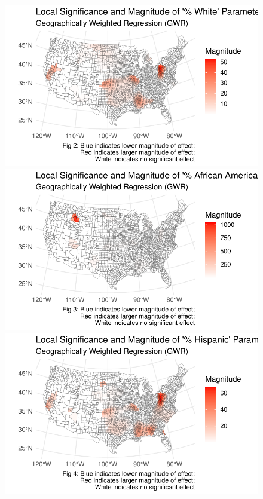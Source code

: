 \documentclass[
]{article}
\begin{document}
\begin{figure}

\begin{minipage}{0.50\linewidth}
\includegraphics{report_files/figure-pdf/unnamed-chunk-4-1.pdf}\end{minipage}%
%
\begin{minipage}{0.50\linewidth}
\includegraphics{report_files/figure-pdf/unnamed-chunk-4-2.pdf}\end{minipage}%
\newline
\begin{minipage}{0.50\linewidth}
\includegraphics{report_files/figure-pdf/unnamed-chunk-4-3.pdf}\end{minipage}%

\end{figure}
\end{document}
